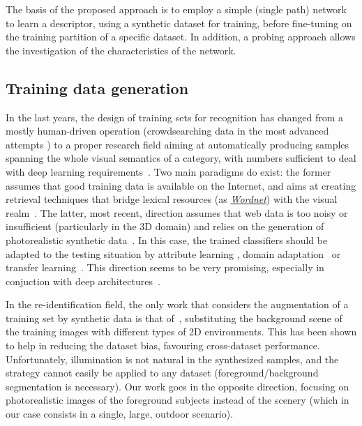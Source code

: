 \documentclass[10pt,journal,letterpaper,compsoc]{IEEEtran}
\begin{document}
The basis of the proposed approach is to employ a simple (single path) network to learn a descriptor, using a synthetic dataset for training, before fine-tuning on the training partition of a specific dataset. In addition, a probing approach allows the investigation of the characteristics of the network.


\subsection{Training data generation}

In the last years, the design of training sets for recognition has changed from a mostly human-driven operation (crowdsearching data in the most advanced attempts \cite{buhrmester2011amazon}) to a proper research field aiming at automatically producing samples spanning the whole visual semantics of a category, with numbers sufficient to deal with deep learning  requirements~\cite{xia2014well,chen2015webly,cheng2015semantically,baochen14BMVC}.
Two main paradigms do exist: the former assumes that good training data is available on the Internet, and aims at creating retrieval techniques that bridge lexical resources (as \href{https://wordnet.princeton.edu/}{\emph{Wordnet}}) with the visual realm~\cite{xia2014well,chen2015webly,cheng2015semantically}. The latter, most recent, direction assumes that web data is too noisy or insufficient (particularly in the 3D domain) and relies on the generation of photorealistic synthetic data~\cite{baochen14BMVC}. In this case, the trained classifiers should be adapted to the testing situation  by attribute learning \cite{lampert2009learning}, domain adaptation~\cite{glorot2011domain} or transfer learning~\cite{pan2010survey}. This direction seems to be very promising, especially in conjuction with deep architectures~\cite{peng2015learning,zhang2015learning,Borji_2016_CVPR}.


In the re-identification field, the only work that considers the augmentation of a training set by synthetic data is that of~\cite{mclaughlin2015data}, substituting the background scene of the training images with different types of 2D environments. This has been shown to help in reducing the dataset bias, favouring cross-dataset performance. Unfortunately, illumination is not natural in the synthesized samples, and the strategy cannot easily be applied to any dataset (foreground/background segmentation is necessary). Our work goes in the opposite direction, focusing on photorealistic images of the foreground subjects instead of the scenery (which in our case consists in a single, large, outdoor scenario).
\end{document}
